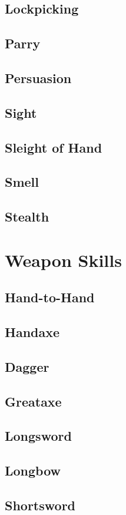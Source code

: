 \subsection{Lockpicking}\label{skill:lockpicking}

\subsection{Parry}\label{skill:parry}

\subsection{Persuasion}\label{skill:persuasion}

\subsection{Sight}\label{skill:sight}

\subsection{Sleight of Hand}\label{skill:sleight-of-hand}

\subsection{Smell}\label{skill:smell}

\subsection{Stealth}\label{skill:stealth}

\section{Weapon Skills}

\subsection{Hand-to-Hand}\label{skill:hand-to-hand}

\subsection{Handaxe}\label{skill:handaxe}

\subsection{Dagger}\label{skill:dagger}

\subsection{Greataxe}\label{skill:greataxe}

\subsection{Longsword}\label{skill:longsword}

\subsection{Longbow}\label{skill:longbow}

\subsection{Shortsword}\label{skill:shortsword}

